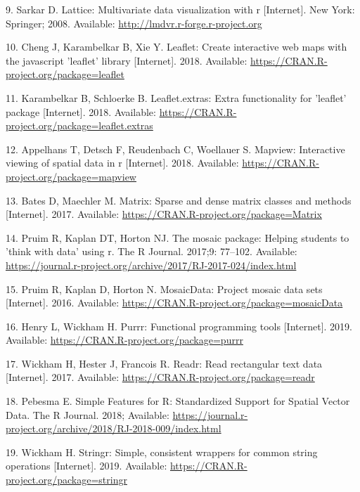 \documentclass[10pt,letterpaper]{article}
\begin{document}
\hypertarget{ref-R-lattice}{}
9. Sarkar D. Lattice: Multivariate data visualization with r
{[}Internet{]}. New York: Springer; 2008. Available:
\url{http://lmdvr.r-forge.r-project.org}

\hypertarget{ref-R-leaflet}{}
10. Cheng J, Karambelkar B, Xie Y. Leaflet: Create interactive web maps
with the javascript 'leaflet' library {[}Internet{]}. 2018. Available:
\url{https://CRAN.R-project.org/package=leaflet}

\hypertarget{ref-R-leaflet.extras}{}
11. Karambelkar B, Schloerke B. Leaflet.extras: Extra functionality for
'leaflet' package {[}Internet{]}. 2018. Available:
\url{https://CRAN.R-project.org/package=leaflet.extras}

\hypertarget{ref-R-mapview}{}
12. Appelhans T, Detsch F, Reudenbach C, Woellauer S. Mapview:
Interactive viewing of spatial data in r {[}Internet{]}. 2018.
Available: \url{https://CRAN.R-project.org/package=mapview}

\hypertarget{ref-R-Matrix}{}
13. Bates D, Maechler M. Matrix: Sparse and dense matrix classes and
methods {[}Internet{]}. 2017. Available:
\url{https://CRAN.R-project.org/package=Matrix}

\hypertarget{ref-R-mosaic}{}
14. Pruim R, Kaplan DT, Horton NJ. The mosaic package: Helping students
to 'think with data' using r. The R Journal. 2017;9: 77--102. Available:
\url{https://journal.r-project.org/archive/2017/RJ-2017-024/index.html}

\hypertarget{ref-R-mosaicData}{}
15. Pruim R, Kaplan D, Horton N. MosaicData: Project mosaic data sets
{[}Internet{]}. 2016. Available:
\url{https://CRAN.R-project.org/package=mosaicData}

\hypertarget{ref-R-purrr}{}
16. Henry L, Wickham H. Purrr: Functional programming tools
{[}Internet{]}. 2019. Available:
\url{https://CRAN.R-project.org/package=purrr}

\hypertarget{ref-R-readr}{}
17. Wickham H, Hester J, Francois R. Readr: Read rectangular text data
{[}Internet{]}. 2017. Available:
\url{https://CRAN.R-project.org/package=readr}

\hypertarget{ref-R-sf}{}
18. Pebesma E. Simple Features for R: Standardized Support for Spatial
Vector Data. The R Journal. 2018; Available:
\url{https://journal.r-project.org/archive/2018/RJ-2018-009/index.html}

\hypertarget{ref-R-stringr}{}
19. Wickham H. Stringr: Simple, consistent wrappers for common string
operations {[}Internet{]}. 2019. Available:
\url{https://CRAN.R-project.org/package=stringr}
\end{document}
